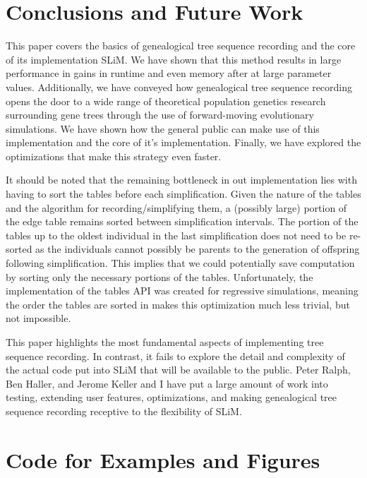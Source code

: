 \documentclass{article}
\begin{document}
\section{Conclusions and Future Work}

This paper covers the basics of genealogical tree sequence recording and the core of its implementation SLiM. 
We have shown that this method results in large performance in gains in runtime and even memory after at large parameter values.
Additionally, we have conveyed how genealogical tree sequence recording
opens the door to a wide range of theoretical population genetics research surrounding gene trees
through the use of forward-moving evolutionary simulations.
We have shown how the general public can make use of this implementation and the core of it's implementation.
Finally, we have explored the optimizations that make this strategy even faster. 

It should be noted that the remaining bottleneck in out implementation
lies with having to sort the tables before each simplification. 
Given the nature of the tables and the algorithm for recording/simplifying them, 
a (possibly large) portion of the edge table remains sorted between simplification intervals. 
The portion of the tables up to the oldest individual in the last simplification
does not need to be re-sorted as the individuals cannot possibly be parents to the generation of offspring following simplification.
This implies that we could potentially save computation by sorting only the necessary portions of the tables.
Unfortunately, the implementation of the tables API was created for regressive simulations, 
meaning the order the tables are sorted in makes this optimization much less trivial, but not impossible. 

This paper highlights the most fundamental aspects of implementing tree sequence recording.
In contrast, it fails to explore the detail and complexity of the actual code put into SLiM that will be available to the public. 
Peter Ralph, Ben Haller, and Jerome Keller and I have put a large amount of work into testing, extending user features,
optimizations, and making genealogical tree sequence recording receptive to the flexibility of SLiM.  

\newpage


{}

\newpage

\section{Code for Examples and Figures}
\end{document}
